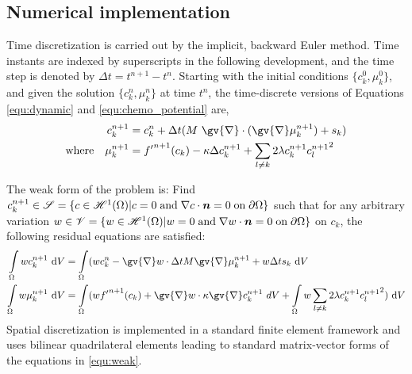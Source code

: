 \documentclass{article}
\newcommand{\grad}[1]{\gv{\nabla} #1}
\def\bn{\mbox{\boldmath$ n$}}
\begin{document}
\subsection{Numerical implementation}
\label{sec:chemo_numerical}
Time discretization is carried out by the implicit, backward Euler method. Time instants are indexed by superscripts in the following development, and the time step is denoted by $\Delta t = t^{n+1}-t^n$. Starting with the initial conditions $\{c_k^0,\mu_k^0\}$, and given the solution $\{c_k^n,\mu_k^n\}$ at time $t^n$, the time-discrete versions of Equations \eqref{equ:dynamic} and \eqref{equ:chemo_potential} are,
\begin{align}
c^{n+1}_{k} &= c^{n}_{k} + \Delta t (M~\grad \cdot (\grad \mu^{n+1}_{k})+s_{k})\nonumber\\
\text{where}\quad\mu^{n+1}_{k} &= {f^\prime}^ {n+1}(c_k) -  \kappa \Delta c^{n+1}_{k} + \sum_{l\ne k}2\lambda  c_k^{n+1} {c_l^{n+1}}^2
\label{equ:time_discretization}
\end{align}

The weak form of the problem is: Find $c^{n+1}_k \in \mathscr{S} = \{c\in \mathscr{H}^1(\Omega)\vert c = 0\;\text{and}\; \nabla c \cdot\bn = 0 \;\text{on}\; \partial\Omega\}$ such that for any arbitrary variation $w \in \mathscr{V} = \{w\in \mathscr{H}^1(\Omega)\vert w = 0\;\text{and}\; \nabla w \cdot\bn = 0 \;\text{on}\; \partial\Omega\}$ on $c_k$, the following residual equations  are satisfied:
\begin{align}
\int\limits_{\Omega}   w c_k^{n+1} ~\text{d}V
&= \int\limits_{\Omega}   (w  c_k^{n} - \grad w \cdot \Delta t M \grad \mu_k^{n+1} + w\Delta t s_k ~\text{d}V\nonumber\\
\int\limits_{\Omega}   w  \mu_{k}^{n+1}  ~\text{d}V 
&=\int\limits_{\Omega}  (w  {f^\prime}^{n+1}(c_k) + \grad w \cdot \kappa \grad c_k^{n+1} ~dV + \int\limits_\Omega w \sum_{l\ne k}2\lambda  c_k^{n+1} {c_l^{n+1}}^2)  ~\text{d}V
\label{equ:weak}
\end{align}
Spatial discretization is implemented in a standard finite element framework and uses bilinear quadrilateral elements leading to standard matrix-vector forms of the equations in \eqref{equ:weak}.
\end{document}
